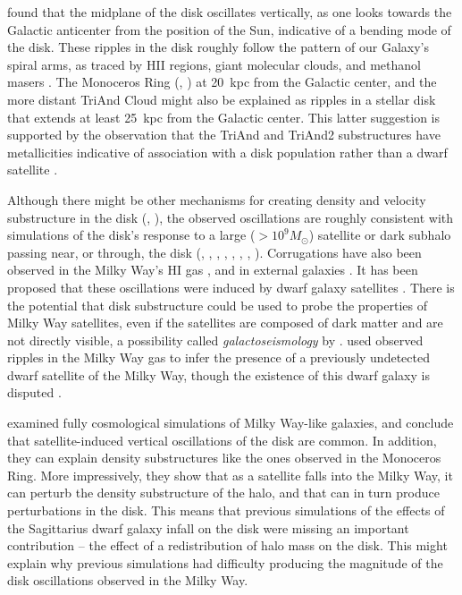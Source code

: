 \documentclass[11pt,preprint]{aastex6}
\begin{document}
\citet{Xu2015} found that the midplane of the disk oscillates vertically, as one looks towards the Galactic anticenter from the position of the Sun, indicative of a bending mode of the disk.  These ripples in the disk roughly follow the pattern of our Galaxy's spiral arms, as traced by HII regions, giant molecular clouds, and methanol masers \citep{Hou2014}.  The Monoceros Ring (\citealt{Yanny2003}, \citealt{Ibata2003}) at 20~kpc from the Galactic center, and the more distant TriAnd Cloud \citep{Rocha2004} might also be explained as ripples in a stellar disk that extends at least 25~kpc from the Galactic center.  This latter suggestion is supported by the observation that the TriAnd and TriAnd2 substructures have metallicities indicative of association with a disk population rather than a dwarf satellite \citep{Price2015}.

Although there might be other mechanisms for creating density and velocity substructure in the disk (\citealt{Debattista2014}, \citealt{Faure2014}), the observed oscillations are roughly consistent with simulations of the disk's response to a large ($>10^9 M_\odot$) satellite or dark subhalo passing near, or through, the disk (\citealt{Kazantzidis2008}, \citealt{Younger2008}, \citealt{2009MNRAS.396L..56M}, \citealt{Purcell2011}, \citealt{Gomez2013}, \citealt{Widrow2014}, \citealt{DOnghia2016}, \citealt{Laporte2016}).  Corrugations have also been observed in the Milky Way's HI gas \citep{Levine2006}, and in external galaxies \citep{Matthews2008}.  It has been proposed that these oscillations were induced by dwarf galaxy satellites \citep{Chakrabarti2011}.  There is the potential that disk substructure could be used to probe the properties of Milky Way satellites, even if the satellites are composed of dark matter and are not directly visible, a possibility called {\it galactoseismology} by \citet{Widrow2012}.  \citet{Chakrabarti2015} used observed ripples in the Milky Way gas to infer the presence of a previously undetected dwarf satellite of the Milky Way, though the existence of this dwarf galaxy is disputed \citep{Pietrukowicz2015}. 

\citet{Gomez2017} examined fully cosmological simulations of Milky Way-like galaxies, and conclude that satellite-induced vertical oscillations of the disk are common.  In addition, they can explain density substructures like the ones observed in the Monoceros Ring.  More impressively, they show that as a satellite falls into the Milky Way, it can perturb the density substructure of the halo, and that can in turn produce perturbations in the disk.  This means that previous simulations of the effects of the Sagittarius dwarf galaxy infall on the disk were missing an important contribution -- the effect of a redistribution of halo mass on the disk.  This might explain why previous simulations had difficulty producing the magnitude of the disk oscillations observed in the Milky Way.
\end{document}

